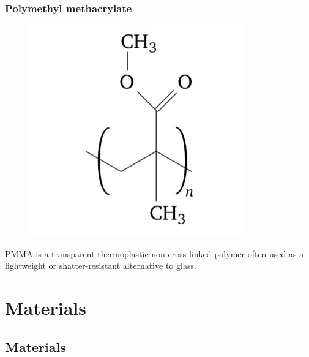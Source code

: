 \documentclass[a4paper, 11pt]{article}
\begin{document}
\subsubsection{Polymethyl methacrylate}

\begin{figure}[h!]
	\centering
	{\includegraphics[scale=0.25]{pmma_chem}}
	\captionsetup{justification=centering}
	\label{fig:PE}
\end{figure}
PMMA  is a transparent thermoplastic non-cross linked polymer often used as a lightweight or shatter-resistant alternative to glass.

\newpage 

\section{Materials}

\subsection{Materials}
\end{document}
